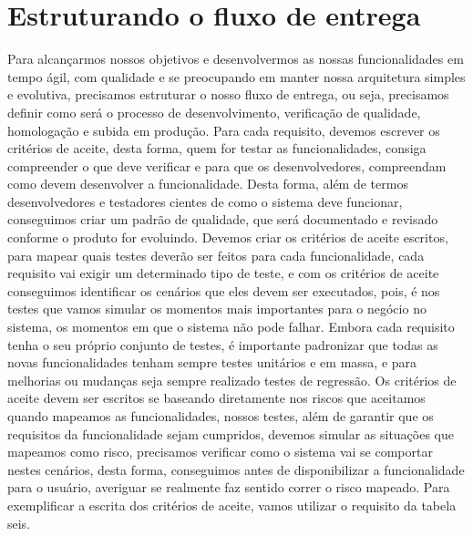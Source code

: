     \section{Estruturando o fluxo de entrega}
      Para alcançarmos nossos objetivos e desenvolvermos as nossas funcionalidades
      em tempo ágil, com qualidade e se preocupando em manter nossa arquitetura
      simples e evolutiva, precisamos estruturar o nosso fluxo de entrega, ou seja,
      precisamos definir como será o processo de desenvolvimento, verificação de
      qualidade, homologação e subida em produção. \newline
      Para cada requisito, devemos escrever os critérios de aceite, desta forma,
      quem for testar as funcionalidades, consiga compreender o que deve verificar
      e para que os desenvolvedores, compreendam como devem desenvolver a
      funcionalidade. Desta forma, além de termos desenvolvedores e testadores
      cientes de como o sistema deve funcionar, conseguimos criar um padrão de
      qualidade, que será documentado e revisado conforme o produto for evoluindo.
      Devemos criar os critérios de aceite escritos, para mapear quais testes deverão
      ser feitos para cada funcionalidade, cada requisito vai exigir um determinado
      tipo de teste, e com os critérios de aceite conseguimos identificar os cenários
      que eles devem ser executados, pois, é nos testes que vamos simular os momentos
      mais importantes para o negócio no sistema, os momentos em que o sistema não
      pode falhar. Embora cada requisito tenha o seu próprio conjunto de testes,
      é importante padronizar que todas as novas funcionalidades tenham sempre testes
      unitários e em massa, e para melhorias ou mudanças seja sempre realizado testes
      de regressão. Os critérios de aceite devem ser escritos se baseando diretamente
      nos riscos que aceitamos quando mapeamos as funcionalidades, nossos testes,
      além de garantir que os requisitos da funcionalidade sejam cumpridos, devemos
      simular as situações que mapeamos como risco, precisamos verificar como o sistema
      vai se comportar nestes cenários, desta forma, conseguimos antes de disponibilizar
      a funcionalidade para o usuário, averiguar se realmente faz sentido correr
      o risco mapeado. Para exemplificar a escrita dos critérios de aceite, vamos
      utilizar o requisito da tabela seis. \newline

